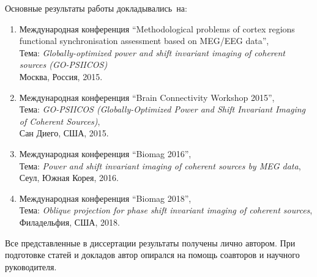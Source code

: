 Основные результаты работы докладывались~на:
\begin{enumerate}
    \item Международная конференция ``Methodological problems of cortex regions functional synchronisation assessment based on MEG/EEG data'',\\
      Тема: \emph{Globally-optimized power and shift invariant imaging of coherent sources (GO-PSIICOS)}\\
      Москва, Россия, 2015.
    \item Международная конференция ``Brain Connectivity Workshop 2015'', \\
        Тема: \emph{GO-PSIICOS (Globally-Optimized Power and Shift Invariant Imaging of Coherent Sources)},\\
        Сан Диего, США, 2015.
    \item Международная конференция ``Biomag 2016'', \\
        Тема: \emph{Power and shift invariant imaging of coherent sources by MEG data},\\
        Сеул, Южная Корея, 2016.
    \item Международная конференция ``Biomag 2018'', \\
        Тема: \emph{Oblique projection for phase shift invariant imaging of coherent sources},\\
        Филадельфия, США, 2018.
\end{enumerate}



{\contribution}
Все представленные в диссертации результаты
получены лично автором.
При подготовке статей и докладов автор опирался
на помощь соавторов и научного руководителя.

